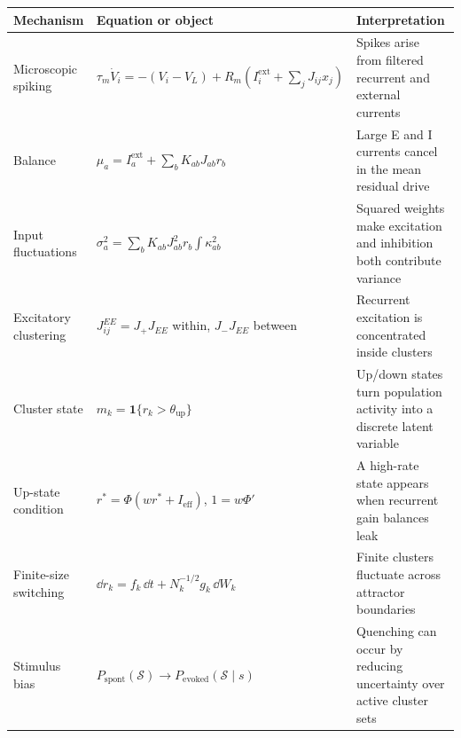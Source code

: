 \begin{chaptersummary}

\begin{center}
\renewcommand{\arraystretch}{1.55}
\begin{tabularx}{\textwidth}{@{}l X X@{}}
  \toprule
  \textbf{Mechanism} & \textbf{Equation or object} & \textbf{Interpretation} \\
  \midrule
  Microscopic spiking &
  $\tau_m\dot V_i=-(V_i-V_L)+R_m(I_i^{\mathrm{ext}}+\sum_jJ_{ij}x_j)$ &
  Spikes arise from filtered recurrent and external currents \\
  Balance &
  $\mu_a=I_a^{\mathrm{ext}}+\sum_bK_{ab}J_{ab}r_b$ &
  Large E and I currents cancel in the mean residual drive \\
  Input fluctuations &
  $\sigma_a^2=\sum_bK_{ab}J_{ab}^2r_b\int\kappa_{ab}^2$ &
  Squared weights make excitation and inhibition both contribute variance \\
  Excitatory clustering &
  $J_{ij}^{EE}=J_+J_{EE}$ within, $J_-J_{EE}$ between &
  Recurrent excitation is concentrated inside clusters \\
  Cluster state &
  $m_k=\mathbf{1}\{r_k>\theta_{\mathrm{up}}\}$ &
  Up/down states turn population activity into a discrete latent variable \\
  Up-state condition &
  $r^*=\Phi(wr^*+I_{\mathrm{eff}})$, $1=w\Phi'$ &
  A high-rate state appears when recurrent gain balances leak \\
  Finite-size switching &
  $\dd r_k=f_k\,\dd t+N_k^{-1/2}g_k\,\dd W_k$ &
  Finite clusters fluctuate across attractor boundaries \\
  Stimulus bias &
  $P_{\mathrm{spont}}(\mathcal{S})\to P_{\mathrm{evoked}}(\mathcal{S}\mid s)$ &
  Quenching can occur by reducing uncertainty over active cluster sets \\
  \bottomrule
\end{tabularx}
\end{center}

\end{chaptersummary}

